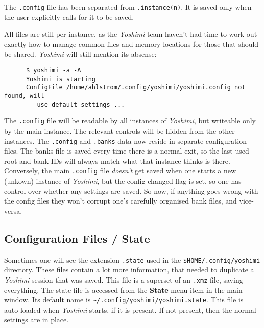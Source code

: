    The \texttt{.config} file has been separated from \texttt{.instance(n)}.
   It is saved only when the user explicitly calls for it to be saved.

   All files are still per instance, as the
   \textsl{Yoshimi} team haven't had time to work out exactly how to manage
   common files and memory locations for those that should be shared.
   \textsl{Yoshimi} will still mention its absense:

   \begin{verbatim}
      $ yoshimi -a -A
      Yoshimi is starting
      ConfigFile /home/ahlstrom/.config/yoshimi/yoshimi.config not found, will
         use default settings ...
   \end{verbatim}

   The \texttt{.config} file will be readable by all instances of
   \textsl{Yoshimi}, but writeable only by the main instance. The relevant
   controls will be hidden from the other instances.  The \texttt{.config} and
   \texttt{.banks} data now reside in separate configuration files.  The banks
   file is saved every time there is a normal exit, so the last-used root and
   bank IDs will always match what that instance thinks is there.  Conversely,
   the main \texttt{.config} file \textsl{doesn't} get saved when one starts a
   new (unkown) instance of \textsl{Yoshimi}, but the config-changed flag is
   set, so one has control over whether any settings are saved.  So now, if
   anything goes wrong with the config files they won't corrupt one's carefully
   organised bank files, and vice-versa.

\subsection{Configuration Files / State}
\label{subsec:configuration_state}

   Sometimes one will see the extension \texttt{.state} used in the
   \texttt{\$HOME/.config/yoshimi} directory.  These files contain a lot more
   information, that needed to duplicate a \textsl{Yoshimi} session that was
   saved.  This file is a superset of an \texttt{.xmz} file, saving everything.
   The state file is accessed from the \textbf{State} menu item in the main
   window.
   Its default name is
   \texttt{\textasciitilde/.config/yoshimi/yoshimi.state}.
   This file is auto-loaded when \textsl{Yoshimi} starts, if it is present. If
   not present, then the normal settings are in place.

